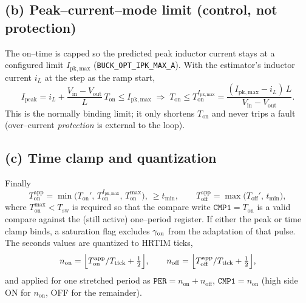 \documentclass[11pt]{article}
\newcommand{\Ton}{T_{\mathrm{on}}}
\newcommand{\Toff}{T_{\mathrm{off}}}
\newcommand{\Vin}{V_{\mathrm{in}}}
\newcommand{\Vout}{V_{\mathrm{out}}}
\newcommand{\Ipk}{I_{\mathrm{pk,max}}}
\newcommand{\Tsw}{T_{\mathrm{sw}}}
\begin{document}
\subsection*{(b) Peak--current--mode limit (control, not protection)}
The on--time is capped so the predicted peak inductor current stays at a
configured limit $\Ipk$ (\texttt{BUCK\_OPT\_IPK\_MAX\_A}). With the estimator's
inductor current $i_L$ at the step as the ramp start,
\begin{equation}
I_{\mathrm{peak}}=i_L+\frac{\Vin-\Vout}{L}\,\Ton\le \Ipk
\;\Longrightarrow\;
\Ton\le \Ton^{\Ipk}=\frac{(\Ipk-i_L)\,L}{\Vin-\Vout}.
\end{equation}
This is the normally binding limit; it only shortens $\Ton$ and never trips a
fault (over--current \emph{protection} is external to the loop).

\subsection*{(c) Time clamp and quantization}
Finally
\begin{equation}
\Ton^{\mathrm{app}}=\min\!\bigl(\Ton',\,\Ton^{\Ipk},\,\Ton^{\max}\bigr),\ \ge t_{\min},
\qquad
\Toff^{\mathrm{app}}=\max\!\bigl(\Toff',\,t_{\min}\bigr),
\end{equation}
where $\Ton^{\max}<\Tsw$ is required so that the compare write $\texttt{CMP1}=\Ton$
is a valid compare against the (still active) one--period register. If either the
peak or time clamp binds, a saturation flag excludes $\gamma_{\rm on}$ from the
adaptation of that pulse. The
seconds values are quantized to HRTIM ticks,
\begin{equation}
n_{\mathrm{on}}=\Bigl\lfloor \Ton^{\mathrm{app}}/T_{\mathrm{tick}}+\tfrac12\Bigr\rfloor,\qquad
n_{\mathrm{off}}=\Bigl\lfloor \Toff^{\mathrm{app}}/T_{\mathrm{tick}}+\tfrac12\Bigr\rfloor,
\end{equation}
and applied for one stretched period as $\texttt{PER}=n_{\mathrm{on}}+n_{\mathrm{off}}$,
$\texttt{CMP1}=n_{\mathrm{on}}$ (high side ON for $n_{\mathrm{on}}$, OFF for the
remainder).
\end{document}

